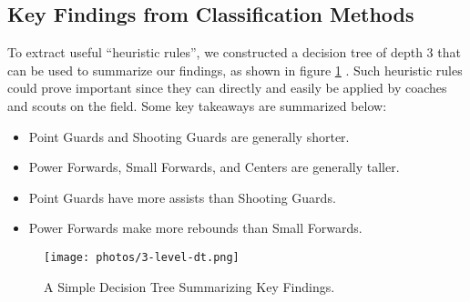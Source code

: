 \documentclass[./main.tex]{subfiles}
\begin{document}
\subsection{Key Findings from Classification Methods}
To extract useful ``heuristic rules'', we constructed a decision tree of depth 3 that can be used to summarize our findings, as shown in figure \ref{fig:3-level-dt}
. Such heuristic rules could prove important since they can directly and easily be applied by coaches and scouts on the field. Some key takeaways are summarized below:
\begin{itemize}[noitemsep, topsep=0pt]
    \item Point Guards and Shooting Guards are generally shorter.
    \item Power Forwards, Small Forwards, and Centers are generally taller.
    \item Point Guards have more assists than Shooting Guards.
    \item Power Forwards make more rebounds than Small Forwards.
\end{itemize} 

\begin{figure}[H]
    \centering
    \texttt{[image: photos/3-level-dt.png]}
    \caption{A Simple Decision Tree Summarizing Key Findings.}
    \label{fig:3-level-dt}
\end{figure}
\end{document}
